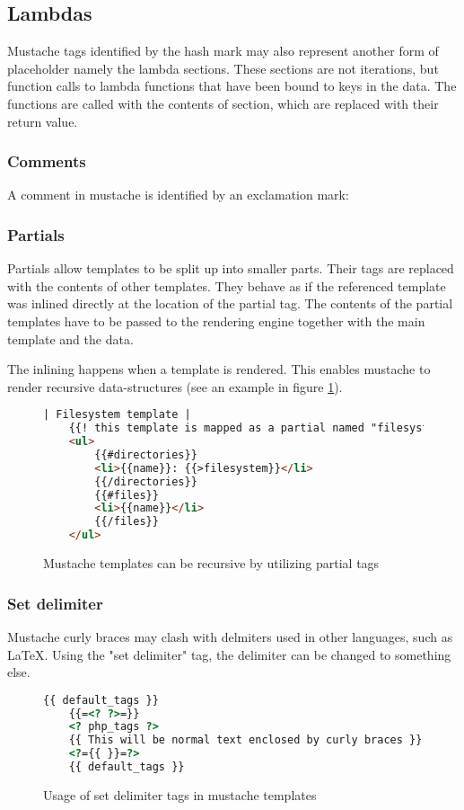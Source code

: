 \subsection{Lambdas}
Mustache tags identified by the hash mark may also represent another form of
placeholder namely the lambda sections. These sections are not iterations, but
function calls to lambda functions that have been bound to keys in the data.
The functions are called with the contents of section, which are replaced
with their return value.

\subsubsection{Comments}
A comment in mustache is identified by an exclamation mark:

\subsubsection{Partials}
Partials allow templates to be split up into smaller parts. Their tags are
replaced with the contents of other templates. They behave as if the referenced
template was inlined directly at the location of the partial tag.
The contents of the partial templates have to be passed to the rendering engine
together with the main template and the data.

The inlining happens when a template is rendered. This enables mustache to
render recursive data-structures
(see an example in figure \ref{fig:partial.mustache}).
\begin{figure}
	\centering
	\caption{Mustache templates can be recursive by utilizing partial tags}
	\label{fig:partial.mustache}
	\begin{lstlisting}[language=HTML]
	| Filesystem template |
	{{! this template is mapped as a partial named "filesystem" }}
	<ul>
		{{#directories}}
		<li>{{name}}: {{>filesystem}}</li>
		{{/directories}}
		{{#files}}
		<li>{{name}}</li>
		{{/files}}
	</ul>
	\end{lstlisting}
\end{figure}

\subsubsection{Set delimiter}
Mustache curly braces may clash with delmiters used in other languages,
such as LaTeX. Using the "set delimiter" tag, the delimiter can be changed to
something else.
\begin{figure}
	\centering
	\caption{Usage of set delimiter tags in mustache templates}
	\label{fig:set-delim.mustache}
	\begin{lstlisting}[language=HTML]
	{{ default_tags }}
	{{=<? ?>=}}
	<? php_tags ?>
	{{ This will be normal text enclosed by curly braces }}
	<?={{ }}=?>
	{{ default_tags }}
	\end{lstlisting}
\end{figure}

